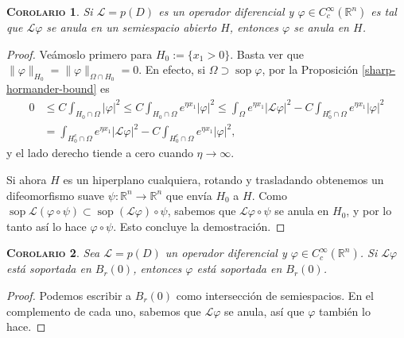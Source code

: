 \documentclass[11pt]{article}
\theoremstyle{colored}
\DeclareMathOperator{\sop}{sop}
\newtheorem{corollary}{\scshape Corolario}
\newcommand{\R}{\mathbb{R}}
\renewcommand{\L}{\mathscr{L}}
\begin{document}
\begin{corollary} Si $\L = p(D)$ es un operador diferencial y $\varphi \in C_c^\infty(\R^n)$ es tal que $\L \varphi$ se anula en un semiespacio abierto $H$, entonces $\varphi$ se anula en $H$.
\end{corollary}
\begin{proof} Veámoslo primero para $H_0 := \{x_1 > 0\}$. Basta ver que $\|\varphi\|_{H_0} = \|\varphi\|_{\Omega \cap H_0} = 0$. En efecto, si $\Omega \supset \sop \varphi$, por la Proposición \ref{sharp-hormander-bound} es
\begin{align*}
0 &\leq C\int_{H_0 \cap \Omega}|\varphi|^2 \leq C\int_{H_0\cap \Omega}e^{\eta x_1}|\varphi|^2 \leq \int_{\Omega}e^{\eta x_1}|\L \varphi|^2 - C\int_{H_0^c \cap \Omega}e^{\eta x_1}|\varphi|^2\\
&= \int_{H_0^c \cap \Omega}e^{\eta x_1}|\L \varphi|^2 - C\int_{H_0^c \cap \Omega}e^{\eta x_1}|\varphi|^2, 
\end{align*}
y el lado derecho tiende a cero cuando $\eta \to \infty$. 

Si ahora $H$ es un hiperplano cualquiera, rotando y trasladando obtenemos un difeomorfismo suave $\psi : \R^n \to \R^n$ que envía $H_0$ a $H$. Como $\sop \L (\varphi \circ \psi) \subset \sop (\L \varphi) \circ \psi$, sabemos que $\L \varphi \circ \psi$ se anula en $H_0$, y por lo tanto así lo hace $\varphi \circ \psi$. Esto concluye la demostración.
\end{proof}

\begin{corollary} Sea $\L = p(D)$ un operador diferencial y $\varphi \in C_c^\infty(\R^n)$. Si $\L \varphi$ está soportada en $B_r(0)$, entonces $\varphi$ está soportada en $B_r(0)$.
\end{corollary}
\begin{proof} Podemos escribir a $B_r(0)$ como intersección de semiespacios. En el complemento de cada uno, sabemos que $\L \varphi$ se anula, así que $\varphi$ también lo hace.
\end{proof}
\end{document}
